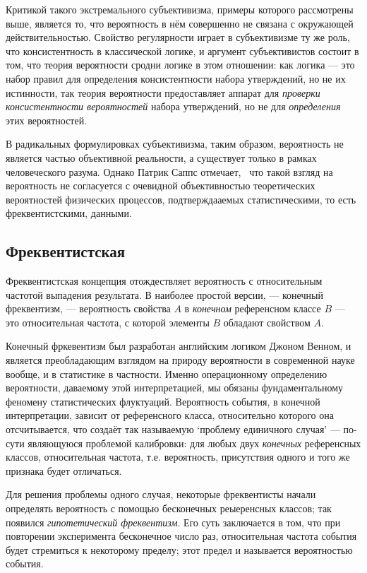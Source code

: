 \documentclass[14pt, a4paper, pdftex]{extarticle}
\begin{document}
Критикой такого экстремального субъективизма, примеры которого рассмотрены выше, является то, что вероятность в нём совершенно не связана с окружающей действительностью. Свойство регулярности играет в субъективизме ту же роль, что консистентность в классической логике, и аргумент субъективистов состоит в том, что теория вероятности сродни логике в этом отношении: как логика --- это набор правил для определения консистентности набора утверждений, но не их истинности, так теория вероятности предоставляет аппарат для \emph{проверки консистентности вероятностей} набора  утверждений, но не для \emph{определения} этих вероятностей.~\cite[стр. 4]{Fuchs}

В радикальных формулировках субъективизма, таким образом, вероятность не является частью объективной реальности, а существует только в рамках человеческого разума. Однако Патрик Саппс отмечает,~\cite{Suppes} что такой взгляд на вероятность не согласуется с очевидной объективностью теоретических вероятностей физических процессов, подтверждааемых статистическими, то есть фреквентистскими, данными.

\subsection{Фреквентистская}

Фреквентистская концепция отождествляет вероятность с относительным частотой выпадения результата. В наиболее простой версии, --- конечный фреквентизм, --- вероятность свойства $A$ в \emph{конечном} референсном классе $B$ --- это относительная частота, с которой элементы $B$ обладают свойством $A$.

Конечный фркевентизм был разработан английским логиком Джоном Венном, и является преобладающим взглядом на природу вероятности в современной науке вообще, и в статистике в частности. Именно операционному определению вероятности, даваемому этой интерпретацией, мы обязаны фундаментальному феномену статистических флуктуаций. Вероятность события, в конечной интерпретации, зависит от референсного класса, относительно которого она отсчитывается, что создаёт так называемую `проблему единичного случая' --- по-сути являющуюся проблемой калибровки: для любых двух \emph{конечных} референсных классов, относительная частота, т.е. вероятность, присутствия одного и того же признака будет отличаться.

Для решения проблемы одного случая, некоторые фреквентисты начали определять вероятность с помощью бесконечных реыеренсных классов; так появился \emph{гипотетический фреквентизм}. Его суть заключается в том, что при повторении эксперимента бесконечное число раз, относительная частота события будет стремиться к некоторому пределу; этот предел и называется вероятностью события.
\end{document}

